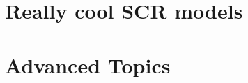 \documentclass{book}
\begin{document}





\part{Really cool SCR models}

















\part{Advanced Topics}





















\end{document}
